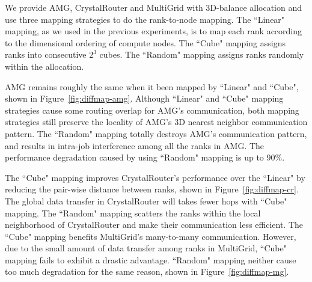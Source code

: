 We provide AMG, CrystalRouter and MultiGrid with 3D-balance allocation and 
use three mapping strategies to do the rank-to-node mapping. 
The ``Linear" mapping, as we used in the previous experiments, 
is to map each rank according to the dimensional ordering of compute nodes. 
The ``Cube" mapping assigns ranks into consecutive $2^{3}$ cubes. 
The ``Random" mapping assigns ranks randomly within the allocation. 

AMG remains roughly the same when it been mapped by ``Linear" and ``Cube", 
shown in Figure~\ref{fig:diffmap-amg}. 
Although ``Linear" and ``Cube" mapping strategies cause some routing overlap for AMG's communication, 
both mapping strategies still preserve the locality of AMG's 3D nearest neighbor communication pattern. 
The ``Random" mapping totally destroys AMG's communication pattern, 
and results in intra-job interference among all the ranks in AMG. 
The performance degradation caused by using ``Random" mapping is up to 90\%.

The ``Cube" mapping improves CrystalRouter's performance over the ``Linear" 
by reducing the pair-wise distance between ranks, shown in Figure~\ref{fig:diffmap-cr}. 
The global data transfer in CrystalRouter will takes fewer hops with ``Cube" mapping. 
The ``Random" mapping scatters the ranks within the local neighborhood 
of CrystalRouter and make their communication less efficient. 
The ``Cube" mapping benefits MultiGrid's many-to-many communication. 
However, due to the small amount of data transfer among ranks in MultiGrid, 
``Cube" mapping fails to exhibit a drastic advantage. 
``Random" mapping neither cause too much degradation for the same reason, 
shown in Figure~\ref{fig:diffmap-mg}.


